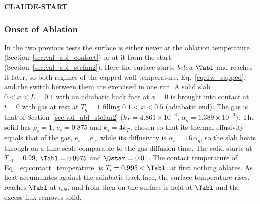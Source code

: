 
\textbf{CLAUDE-START}
\subsubsection{Onset of Ablation}
\label{sec:val_abl_onset}

In the two previous tests the surface is either never at the ablation temperature (Section~\ref{sec:val_abl_contact}) or at it from the start (Section~\ref{sec:val_abl_stefan2}). Here the surface starts \emph{below} $\Tabl$ and reaches it later, so both regimes of the capped wall temperature, Eq.~\ref{eq:Tw_capped}, and the switch between them are exercised in one run. A solid slab $0 < x < L = 0.1$ with an adiabatic back face at $x = 0$ is brought into contact at $t = 0$ with gas at rest at $T_g = 1$ filling $0.1 < x < 0.5$ (adiabatic end). The gas is that of Section~\ref{sec:val_abl_stefan2} ($k_T = 4.861\times10^{-3}$, $\alpha_g = 1.389\times10^{-3}$). The solid has $\rho_s = 1$, $c_s = 0.875$ and $k_s = 4k_T$, chosen so that its thermal effusivity equals that of the gas, $e_s = e_g$, while its diffusivity is $\alpha_s = 16\,\alpha_g$, so the slab heats through on a time scale comparable to the gas diffusion time. The solid starts at $T_{s0} = 0.99$, $\Tabl = 0.9975$ and $\Qstar = 0.01$. The contact temperature of Eq.~\ref{eq:contact_temperature} is $T_i = 0.995 < \Tabl$: at first nothing ablates. As heat accumulates against the adiabatic back face, the surface temperature rises, reaches $\Tabl$ at $t_{abl}$, and from then on the surface is held at $\Tabl$ and the excess flux removes solid.

